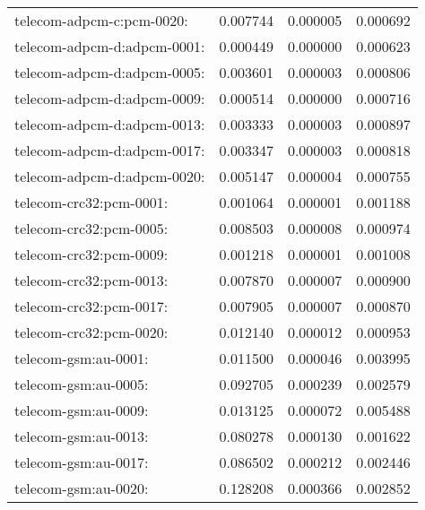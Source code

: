 \begin{longtable}{lrrr}
telecom-adpcm-c:pcm-0020: & 0.007744 & 0.000005 & 0.000692 \\
telecom-adpcm-d:adpcm-0001: & 0.000449 & 0.000000 & 0.000623 \\
telecom-adpcm-d:adpcm-0005: & 0.003601 & 0.000003 & 0.000806 \\
telecom-adpcm-d:adpcm-0009: & 0.000514 & 0.000000 & 0.000716 \\
telecom-adpcm-d:adpcm-0013: & 0.003333 & 0.000003 & 0.000897 \\
telecom-adpcm-d:adpcm-0017: & 0.003347 & 0.000003 & 0.000818 \\
telecom-adpcm-d:adpcm-0020: & 0.005147 & 0.000004 & 0.000755 \\
telecom-crc32:pcm-0001: & 0.001064 & 0.000001 & 0.001188 \\
telecom-crc32:pcm-0005: & 0.008503 & 0.000008 & 0.000974 \\
telecom-crc32:pcm-0009: & 0.001218 & 0.000001 & 0.001008 \\
telecom-crc32:pcm-0013: & 0.007870 & 0.000007 & 0.000900 \\
telecom-crc32:pcm-0017: & 0.007905 & 0.000007 & 0.000870 \\
telecom-crc32:pcm-0020: & 0.012140 & 0.000012 & 0.000953 \\
telecom-gsm:au-0001: & 0.011500 & 0.000046 & 0.003995 \\
telecom-gsm:au-0005: & 0.092705 & 0.000239 & 0.002579 \\
telecom-gsm:au-0009: & 0.013125 & 0.000072 & 0.005488 \\
telecom-gsm:au-0013: & 0.080278 & 0.000130 & 0.001622 \\
telecom-gsm:au-0017: & 0.086502 & 0.000212 & 0.002446 \\
telecom-gsm:au-0020: & 0.128208 & 0.000366 & 0.002852 \\
\end{longtable}

